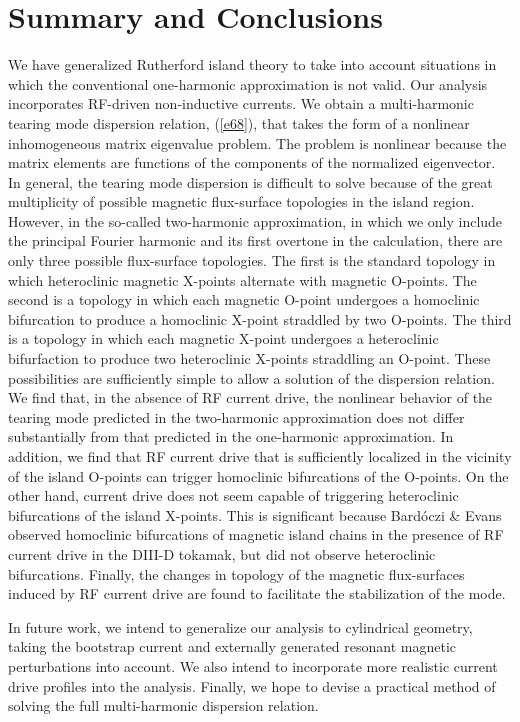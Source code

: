 \documentclass[12pt,prb,aps]{revtex4-1}
\begin{document}
\section{Summary and Conclusions}
We have generalized Rutherford island theory to take into account situations in which the conventional one-harmonic
approximation is not valid. Our analysis incorporates RF-driven non-inductive currents. We obtain a
multi-harmonic tearing mode dispersion relation, (\ref{e68}), that takes the form of a nonlinear inhomogeneous matrix
eigenvalue problem. The problem is nonlinear because the matrix elements are functions of the components of the normalized eigenvector. In general, the tearing mode dispersion is difficult to solve because of the great multiplicity of
possible magnetic flux-surface topologies in the island region. However, in the so-called two-harmonic approximation,
in which we only include the principal Fourier harmonic and its first overtone in the calculation, there are
only three possible flux-surface topologies. The first is the standard topology in which heteroclinic magnetic X-points
alternate with magnetic O-points. The second is a topology in which each magnetic O-point undergoes a
homoclinic bifurcation to produce a  homoclinic X-point straddled by two O-points. The third
is a topology in which each magnetic X-point undergoes a heteroclinic bifurfaction to produce two
heteroclinic X-points straddling an O-point. These possibilities are sufficiently simple to allow a solution of the dispersion relation. 
We find that, in the absence of RF current drive, the nonlinear behavior of the tearing
mode predicted in the two-harmonic approximation does not differ substantially from that predicted in the
 one-harmonic approximation. In addition, we find that RF current drive that is sufficiently localized in the
vicinity of the island O-points can trigger homoclinic bifurcations of the O-points. On the other hand, current
drive does not seem capable of triggering heteroclinic bifurcations of the island X-points. This is significant because
 Bard\'{o}czi \& Evans observed homoclinic bifurcations of magnetic island chains in the presence of RF
 current drive in the DIII-D tokamak,\cite{bar}  but did not observe heteroclinic bifurcations. Finally, the changes in topology of the magnetic
 flux-surfaces induced by RF current drive are found to facilitate the stabilization of the mode. 
 
In future work, we intend to generalize our analysis to cylindrical geometry, taking the bootstrap current and externally
generated resonant magnetic perturbations into account. We also intend to incorporate more realistic current drive
profiles into the analysis. Finally, we hope to devise a practical method of solving the full multi-harmonic dispersion
relation. 
\end{document}
